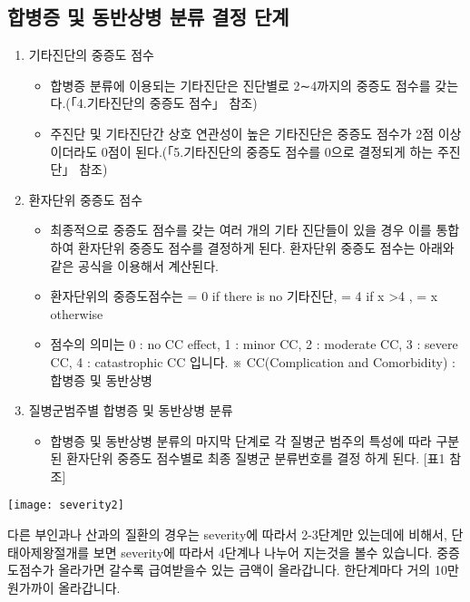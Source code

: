\subsection{합병증 및 동반상병 분류 결정 단계}
\begin{enumerate}[(1)]\tightlist 
\item 기타진단의 중증도 점수
	\begin{itemize}\tightlist
	\item 합병증 분류에 이용되는 기타진단은 진단별로 2∼4까지의 중증도 점수를 갖는다.(「4.기타진단의 중증도 점수」 참조)
	\item 주진단 및 기타진단간 상호 연관성이 높은 기타진단은 중증도 점수가 2점 이상이더라도 0점이 된다.(「5.기타진단의 중증도 점수를 0으로 결정되게 하는 주진단」 참조)
	\end{itemize}
\item 환자단위 중증도 점수
	\begin{itemize}\tightlist
	\item 최종적으로 중증도 점수를 갖는 여러 개의 기타 진단들이 있을 경우 이를 통합하여 환자단위 중증도 점수를 결정하게 된다. 환자단위 중증도 점수는 아래와 같은 공식을 이용해서 계산된다.
	\item 환자단위의 중증도점수는  = 0 if there is no 기타진단, = 4 if x >4 , = x otherwise
	\item 점수의 의미는 0 : no CC effect, 1 : minor CC, 2 : moderate CC, 3 : severe CC, 4 : catastrophic CC 입니다. ※ CC(Complication and Comorbidity) : 합병증 및 동반상병
	\end{itemize}

\item 질병군범주별 합병증 및 동반상병 분류
	\begin{itemize}\tightlist
	\item 합병증 및 동반상병 분류의 마지막 단계로 각 질병군 범주의 특성에
따라 구분된 환자단위 중증도 점수별로 최종 질병군 분류번호를 결정
하게 된다. [표1 참조]
	\end{itemize}
\end{enumerate}
\prezi{\clearpage}
\texttt{[image: severity2]}	
\par
\medskip
다른 부인과나 산과의 질환의 경우는 severity에 따라서 2-3단계만 있는데에 비해서, 단태아제왕절개를 보면 severity에 따라서 4단계나 나누어 지는것을 볼수 있습니다. 중증도점수가 올라가면 갈수록 급여받을수 있는 금액이 올라갑니다. 한단계마다 거의 10만원가까이 올라갑니다.%

